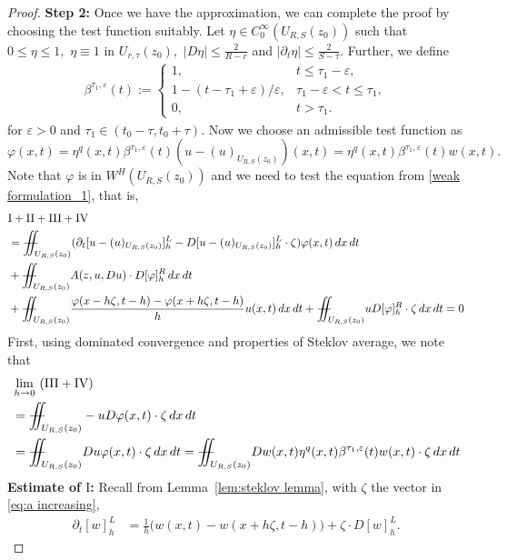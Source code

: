 \documentclass[notitlepage,11pt,reqno]{amsart}
\theoremstyle{definition}
\numberwithin{equation}{section}
\newcommand{\iintss}{{\int\hspace{-0.28cm}\int}}
\newcommand{ \miints }{{\iintss\hspace{-0.56cm} -\hspace{-0.15cm}-}}
\newcommand{\miint}[1]{{\miints_{\hspace{-0.13cm}#1}}}
\begin{document}
\begin{proof}
\textbf{Step 2:} Once we have the approximation, we can complete the proof by choosing the test function suitably. Let $\eta \in C^{\infty}_{0}(U_{R, S}(z_0))$ such that $0\leq \eta\leq 1, $ $\eta \equiv 1$ in $U_{r, \tau}(z_0),$ $|D\eta| \leq \frac{2}{R-r}$ and $|\partial_t\eta|\leq \frac{2}{S-\tau}.$ Further, we define
\begin{align*}
\beta^{\tau_1,\varepsilon}(t):=\begin{cases}
1, & t\leq\tau_1-\varepsilon,\\
1-(t-\tau_1+\varepsilon)/\varepsilon, & \tau_1-\varepsilon<t\leq\tau_1,\\
0, & t>\tau_1.
\end{cases}
\end{align*}
for $\varepsilon>0$ and $\tau_1 \in (t_0-\tau, t_0+\tau).$ Now we choose an admissible test function as
\[\varphi (x,t)=\eta^q (x, t) \beta^{\tau_1, \varepsilon}(t)\left(u-(u)_{U_{R, S}(z_0)}\right)(x, t)=\eta^q(x, t)\beta^{\tau_1, \varepsilon}(t)w(x, t).\] Note that $\varphi$ is in $W^{H}(U_{R, S}(z_0))$ and we need to test the equation from \eqref{weak formulation_1}, that is, 
\begin{align*}
&\mathrm{I}+\mathrm{II}+\mathrm{III}+\mathrm{IV}\\
&=\miint{U_{R, S}(z_0)}(\partial_{t}[u-(u)_{U_{R, S}(z_0)}]^L_{h}-D[u-(u)_{U_{R, S}(z_0)}]^L_h\cdot \zeta)\varphi(x, t)\, dx\, dt\\
&+\miint{U_{R, S}(z_0)}A(z, u, Du)\cdot D[\varphi]^{R}_{h}\,dx\, dt\\
&+\miint{U_{R, S}(z_0)}\frac{\varphi(x-h\zeta, t-h)-\varphi(x+h\zeta, t-h)}{h}u(x, t)\,dx\, dt+\miint{U_{R, S}(z_0)}uD[\varphi]^R_h\cdot \zeta \, dx\, dt=0
\end{align*}
First, using dominated convergence and properties of Steklov average, we note that
\begin{align}\label{eq: 1.16}
    &\lim_{h \to 0}\,\, (\mathrm{III}+\mathrm{IV})\\
    &=\miint{U_{R, S}(z_0)}-u D\varphi(x, t)\cdot \zeta\, dx\, dt\nonumber\\
    &=\miint{U_{R, S}(z_0)}Du \varphi(x, t)\cdot \zeta\, dx\, dt=\miint{U_{R, S}(z_0)}Dw(x, t) \eta^q (x, t) \beta^{\tau_1, \varepsilon}(t)w(x, t)\cdot \zeta\, dx\, dt
\end{align}
\noindent \textbf{Estimate of $\mathrm{I}$:} Recall from Lemma~\ref{lem:steklov lemma}, with $\zeta$ the vector in \eqref{eq:a increasing},
\begin{align}\label{equation L}
\partial_t[w]^L_h&=\tfrac1h\big(w(x,t)-w(x+h\zeta,t-h)\big)+\zeta\cdot D[w]^L_h. \tag{L}

\end{align}
\end{proof}
\end{document}

